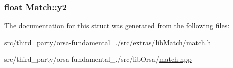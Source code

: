 \subsubsection[{y2}]{\setlength{\rightskip}{0pt plus 5cm}float Match\+::y2}\label{structMatch_ad266af2f32a1b4533e3a66d963bae22c}


The documentation for this struct was generated from the following files\+:\begin{DoxyCompactItemize}
\item 
src/third\+\_\+party/orsa-\/fundamental\+\_./src/extras/lib\+Match/\hyperlink{match_8h}{match.\+h}\item 
src/third\+\_\+party/orsa-\/fundamental\+\_./src/lib\+Orsa/\hyperlink{match_8hpp}{match.\+hpp}\end{DoxyCompactItemize}
